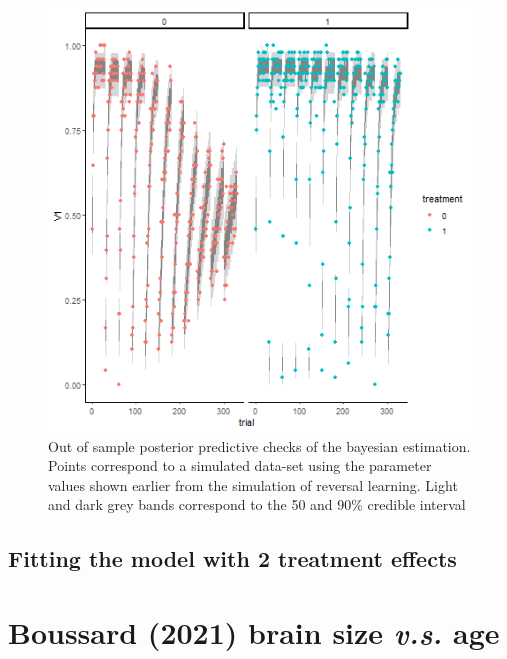 \documentclass[
]{article}
\begin{document}
\begin{figure}

\includegraphics[width=6.67in,]{images/sim_reversal_ppchecks} \hfill{}

\caption{Out of sample posterior predictive checks of the bayesian estimation. Points correspond to a simulated data-set using the parameter values shown earlier from the simulation of reversal learning. Light and dark grey bands correspond to the 50 and 90\% credible interval}\label{fig:ppcheck_rev_sim}
\end{figure}

\hypertarget{fitting-the-model-with-2-treatment-effects}{%
\subsection{Fitting the model with 2 treatment
effects}\label{fitting-the-model-with-2-treatment-effects}}

\hypertarget{boussard--boussard_link_2021-brain-size-v.s.-age}{%
\section{\texorpdfstring{Boussard (2021) brain size \emph{v.s.}
age}{Boussard (2021) brain size v.s. age}}\label{boussard--boussard_link_2021-brain-size-v.s.-age}}
\end{document}
